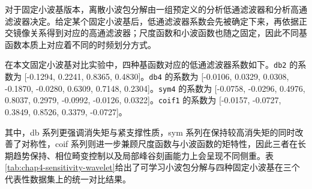对于固定小波基版本，离散小波包分解由一组预定义的分析低通滤波器和分析高通滤波器决定。给定某个固定小波基后，低通滤波器系数会先被确定下来，再依据正交镜像关系得到对应的高通滤波器；尺度函数和小波函数也随之固定，因此不同基函数本质上对应着不同的时频划分方式。

在本文固定小波基对比实验中，四种基函数对应的低通滤波器系数如下。\texttt{db2} 的系数为 [-0.1294, 0.2241, 0.8365, 0.4830]。\texttt{db4} 的系数为 [-0.0106, 0.0329, 0.0308, -0.1870, -0.0280, 0.6309, 0.7148, 0.2304]。\texttt{sym4} 的系数为 [-0.0758, -0.0296, 0.4976, 0.8037, 0.2979, -0.0992, -0.0126, 0.0322]。\texttt{coif1} 的系数为 [-0.0157, -0.0727, 0.3849, 0.8526, 0.3379, -0.0727]。

其中，db 系列更强调消失矩与紧支撑性质，sym 系列在保持较高消失矩的同时改善了对称性，coif 系列则进一步兼顾尺度函数与小波函数的矩特性，因此三者在长期趋势保持、相位畸变控制以及局部峰谷刻画能力上会呈现不同侧重。表\ref{tab:chap4-sensitivity-wavelet}给出了可学习小波包分解与四种固定小波基在三个代表性数据集上的统一对比结果。

